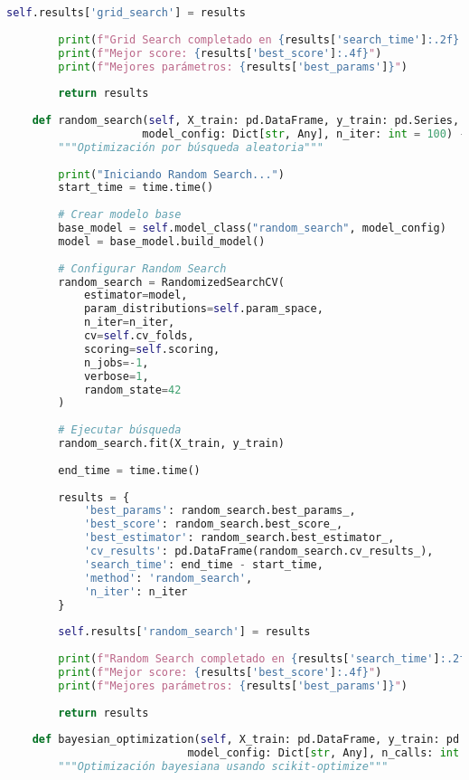 \begin{lstlisting}[language=Python, caption=Sistema de optimización de hiperparámetros]
        self.results['grid_search'] = results
        
        print(f"Grid Search completado en {results['search_time']:.2f} segundos")
        print(f"Mejor score: {results['best_score']:.4f}")
        print(f"Mejores parámetros: {results['best_params']}")
        
        return results
    
    def random_search(self, X_train: pd.DataFrame, y_train: pd.Series, 
                     model_config: Dict[str, Any], n_iter: int = 100) -> Dict[str, Any]:
        """Optimización por búsqueda aleatoria"""
        
        print("Iniciando Random Search...")
        start_time = time.time()
        
        # Crear modelo base
        base_model = self.model_class("random_search", model_config)
        model = base_model.build_model()
        
        # Configurar Random Search
        random_search = RandomizedSearchCV(
            estimator=model,
            param_distributions=self.param_space,
            n_iter=n_iter,
            cv=self.cv_folds,
            scoring=self.scoring,
            n_jobs=-1,
            verbose=1,
            random_state=42
        )
        
        # Ejecutar búsqueda
        random_search.fit(X_train, y_train)
        
        end_time = time.time()
        
        results = {
            'best_params': random_search.best_params_,
            'best_score': random_search.best_score_,
            'best_estimator': random_search.best_estimator_,
            'cv_results': pd.DataFrame(random_search.cv_results_),
            'search_time': end_time - start_time,
            'method': 'random_search',
            'n_iter': n_iter
        }
        
        self.results['random_search'] = results
        
        print(f"Random Search completado en {results['search_time']:.2f} segundos")
        print(f"Mejor score: {results['best_score']:.4f}")
        print(f"Mejores parámetros: {results['best_params']}")
        
        return results
    
    def bayesian_optimization(self, X_train: pd.DataFrame, y_train: pd.Series, 
                            model_config: Dict[str, Any], n_calls: int = 50):
        """Optimización bayesiana usando scikit-optimize"""
        

\end{lstlisting}
